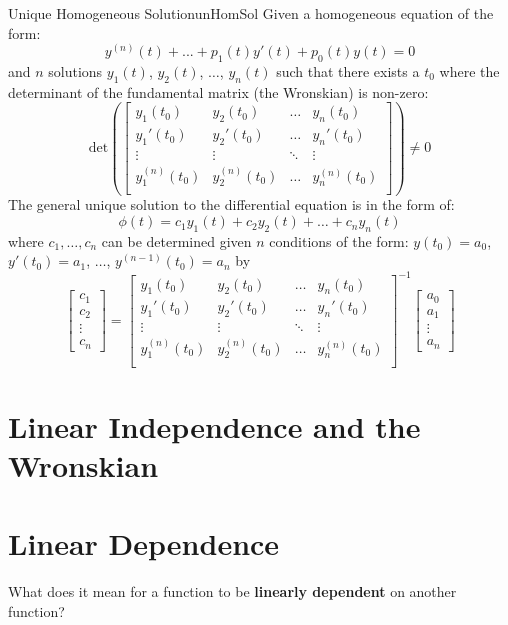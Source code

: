 \documentclass{report}
\begin{document}
\begin{mytheo}{Unique Homogeneous Solution}{unHomSol}
 Given a homogeneous equation of the form:
  $$y^{(n)}(t) + ... + p_1(t)y'(t) + p_0(t)y(t) = 0$$
  and $n$ solutions $y_1(t)$, $y_2(t)$, $\dots$, $y_n(t)$ such that there exists a $t_0$ where the determinant of the fundamental matrix (the Wronskian) is non-zero:
  $$\text{det}\left(\begin{bmatrix}
    y_1(t_0) & y_2(t_0) & \dots  & y_n(t_0) \\
    y_1'(t_0) & y_2'(t_0) & \dots  & y_n'(t_0) \\
    \vdots & \vdots & \ddots & \vdots \\
    y_1^{(n)}(t_0) & y_2^{(n)}(t_0) & \dots  & y_n^{(n)}(t_0) \\
    \end{bmatrix}\right)
    \neq 0
    $$
 The general unique solution to the differential equation is in the form of:
 $$\phi(t) = c_1y_1(t) + c_2y_2(t) + \dots + c_ny_n(t)$$
 where $c_1, \dots, c_n$ can be determined given $n$ conditions of the form:
 $y(t_0) = a_0$, $y'(t_0) = a_1$, $\dots$, $y^{(n-1)}(t_0) = a_n$ by 
 $$
\begin{bmatrix}
    c_1 \\
    c_2 \\
    \vdots \\
    c_n
\end{bmatrix}
=
\begin{bmatrix}
    y_1(t_0) & y_2(t_0) & \dots  & y_n(t_0) \\
    y_1'(t_0) & y_2'(t_0) & \dots  & y_n'(t_0) \\
    \vdots & \vdots & \ddots & \vdots \\
    y_1^{(n)}(t_0) & y_2^{(n)}(t_0) & \dots  & y_n^{(n)}(t_0) \\
    \end{bmatrix}^{-1}
\begin{bmatrix}
    a_0 \\
    a_1 \\
    \vdots \\ 
    a_n
\end{bmatrix}
$$
\end{mytheo}

\section{Linear Independence and the Wronskian}
\section{Linear Dependence}
What does it mean for a function to be \textbf{linearly dependent} on another function? 
\end{document}
